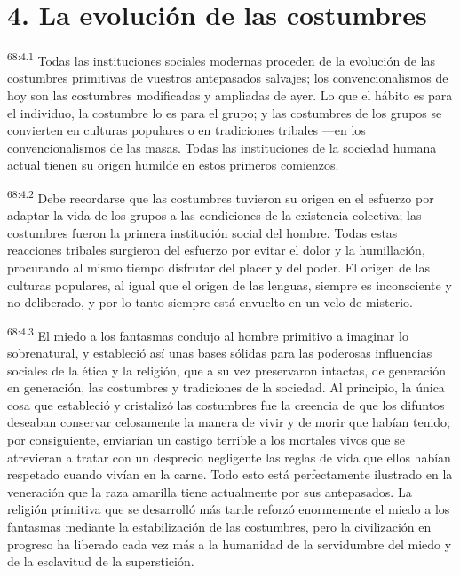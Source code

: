 \documentclass[twoside, 11pt]{book}
\begin{document}
\section*{4. La evolución de las costumbres}
\par
\textsuperscript{68:4.1} Todas las instituciones sociales modernas proceden de la evolución de las costumbres primitivas de vuestros antepasados salvajes; los convencionalismos de hoy son las costumbres modificadas y ampliadas de ayer. Lo que el hábito es para el individuo, la costumbre lo es para el grupo; y las costumbres de los grupos se convierten en culturas populares o en tradiciones tribales ---en los convencionalismos de las masas. Todas las instituciones de la sociedad humana actual tienen su origen humilde en estos primeros comienzos.

\par
\textsuperscript{68:4.2} Debe recordarse que las costumbres tuvieron su origen en el esfuerzo por adaptar la vida de los grupos a las condiciones de la existencia colectiva; las costumbres fueron la primera institución social del hombre. Todas estas reacciones tribales surgieron del esfuerzo por evitar el dolor y la humillación, procurando al mismo tiempo disfrutar del placer y del poder. El origen de las culturas populares, al igual que el origen de las lenguas, siempre es inconsciente y no deliberado, y por lo tanto siempre está envuelto en un velo de misterio.

\par
\textsuperscript{68:4.3} El miedo a los fantasmas condujo al hombre primitivo a imaginar lo sobrenatural, y estableció así unas bases sólidas para las poderosas influencias sociales de la ética y la religión, que a su vez preservaron intactas, de generación en generación, las costumbres y tradiciones de la sociedad. Al principio, la única cosa que estableció y cristalizó las costumbres fue la creencia de que los difuntos deseaban conservar celosamente la manera de vivir y de morir que habían tenido; por consiguiente, enviarían un castigo terrible a los mortales vivos que se atrevieran a tratar con un desprecio negligente las reglas de vida que ellos habían respetado cuando vivían en la carne. Todo esto está perfectamente ilustrado en la veneración que la raza amarilla tiene actualmente por sus antepasados. La religión primitiva que se desarrolló más tarde reforzó enormemente el miedo a los fantasmas mediante la estabilización de las costumbres, pero la civilización en progreso ha liberado cada vez más a la humanidad de la servidumbre del miedo y de la esclavitud de la superstición.
\end{document}
